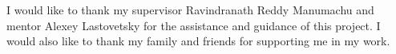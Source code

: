 I would like to thank my supervisor Ravindranath Reddy Manumachu and mentor Alexey Lastovetsky for the assistance and guidance of this project. I would also like to thank my family and friends for supporting me in my work.